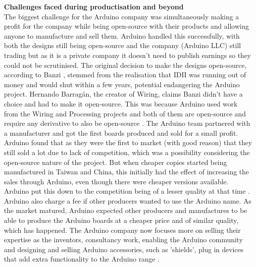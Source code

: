 \textbf{Challenges faced during productisation and beyond}\\
The biggest challenge for the Arduino company was simultaneously making a profit for the company while being open-source with their products and allowing anyone to manufacture and sell them. Arduino handled this successfully, with both the designs still being open-source and the company (Arduino LLC) still trading but as it is a private company it doesn't need to publish earnings so they could not be scrutinised. The original decision to make the designs open-source, according to Banzi 
\cite{RN111} \cite{RN103}, stemmed from the realisation that IDII was running out of money and would shut within a few years, potential endangering the Arduino project. Hernando Barragán, the creator of Wiring, claims Banzi didn't have a choice and had to make it open-source. This was because Arduino used work from the Wiring and Processing projects and both of them are open-source and require any derivative to also be open-source 
\cite{RN110}. The Arduino team partnered with a manufacturer and got the first boards produced and sold for a small profit. Arduino found that as they were the first to market (with good reason) that they still sold a lot due to lack of competition, which was a possibility considering the open-source nature of the project. But when cheaper copies started being manufactured in Taiwan and China, this initially had the effect of increasing the sales through Arduino, even though there were cheaper versions available. Arduino put this down to the competition being of a lesser quality at that time 
\cite{RN113}. Arduino also charge a fee if other producers wanted to use the Arduino name. As the market matured, Arduino expected other producers and manufactures to be able to produce the Arduino boards at a cheaper price and of similar quality, which has happened. The Arduino company now focuses more on selling their expertise as the inventors, consultancy work, enabling the Arduino community and designing and selling Arduino accessories, such as 'shields', plug in devices that add extra functionality to the Arduino range 
\cite{RN113}.\\

